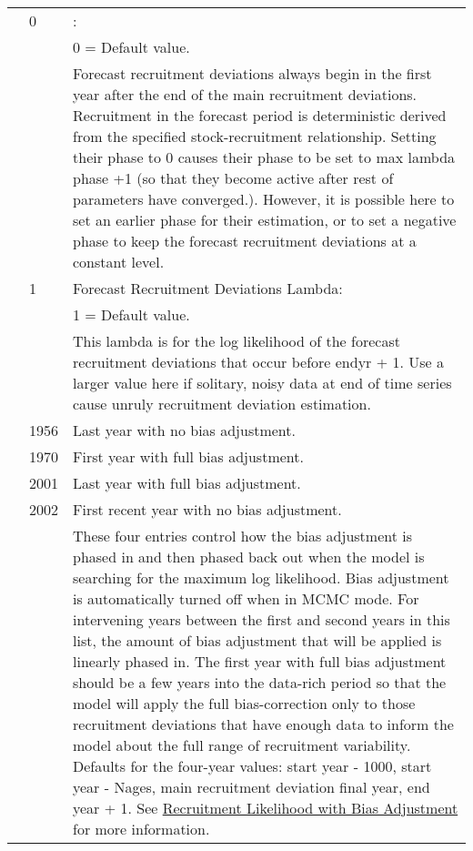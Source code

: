 \begin{longtable}{p{1cm} p{3cm} p{12cm}}
	\Tstrut & 0 & \raisebox{0.1\ht\strutbox}{\hypertarget{FcastRecDevPhase}{Forecast Recruitment Deviations Phase}}: \\
			&   & 0 = Default value. \\
			&   & Forecast recruitment deviations always begin in the first year after the end of the main recruitment deviations. Recruitment in the forecast period is deterministic derived from the specified stock-recruitment relationship. Setting their phase to 0 causes their phase to be set to max lambda phase +1 (so that they become active after rest of parameters have converged.). However, it is possible here to set an earlier phase for their estimation, or to set a negative phase to keep the forecast recruitment deviations at a constant level. \Bstrut\\

	\Tstrut & 1 & Forecast Recruitment Deviations Lambda: \\
			&   & 1 = Default value. \\
			&   & This lambda is for the log likelihood of the forecast recruitment deviations that occur before endyr + 1. Use a larger value here if solitary, noisy data at end of time series cause unruly recruitment deviation estimation. \\
	
	\Tstrut & 1956 & Last year with no bias adjustment. \\
			& 1970 & First year with full bias adjustment. \\
			& 2001 & Last year with full bias adjustment. \\
			& 2002 & First recent year with no bias adjustment. \\
			& 	   & These four entries control how the bias adjustment is phased in and then phased back out when the model is searching for the maximum log likelihood. Bias adjustment is automatically turned off when in MCMC mode. For intervening years between the first and second years in this list, the amount of bias adjustment that will be applied is linearly phased in. The first year with full bias adjustment should be a few years into the data-rich period so that the model will apply the full bias-correction only to those recruitment deviations that have enough data to inform the model about the full range of recruitment variability. Defaults for the four-year values: start year - 1000, start year - Nages, main recruitment deviation final year, end year + 1. See \hyperlink{RecBias}{Recruitment Likelihood with Bias Adjustment} for more information. \\
	

\end{longtable}
